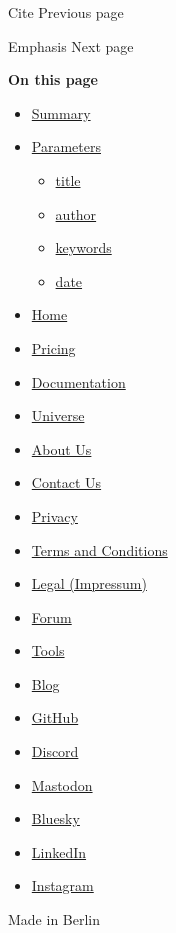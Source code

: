 { Cite } { Previous page }

\href{/docs/reference/model/emph/}{\pandocbounded{}}

{ Emphasis } { Next page }

\textbf{On this page}

\begin{itemize}
\tightlist
\item
  \hyperref[summary]{Summary}
\item
  \hyperref[parameters]{Parameters}

  \begin{itemize}
  \tightlist
  \item
    \hyperref[parameters-title]{title}
  \item
    \hyperref[parameters-author]{author}
  \item
    \hyperref[parameters-keywords]{keywords}
  \item
    \hyperref[parameters-date]{date}
  \end{itemize}
\end{itemize}

\begin{itemize}
\tightlist
\item
  \href{/}{Home}
\item
  \href{/pricing/}{Pricing}
\item
  \href{/docs/}{Documentation}
\item
  \href{/universe/}{Universe}
\item
  \href{/about/}{About Us}
\item
  \href{/contact/}{Contact Us}
\item
  \href{/privacy/}{Privacy}
\item
  \href{https://typst.app/terms}{Terms and Conditions}
\item
  \href{/legal/}{Legal (Impressum)}
\end{itemize}

\begin{itemize}
\tightlist
\item
  \href{https://forum.typst.app}{Forum}
\item
  \href{/tools/}{Tools}
\item
  \href{/blog/}{Blog}
\item
  \href{https://github.com/typst/}{GitHub}
\item
  \href{https://discord.gg/2uDybryKPe}{Discord}
\item
  \href{https://mastodon.social/@typst}{Mastodon}
\item
  \href{https://bsky.app/profile/typst.app}{Bluesky}
\item
  \href{https://www.linkedin.com/company/typst/}{LinkedIn}
\item
  \href{https://instagram.com/typstapp/}{Instagram}
\end{itemize}

Made in Berlin
